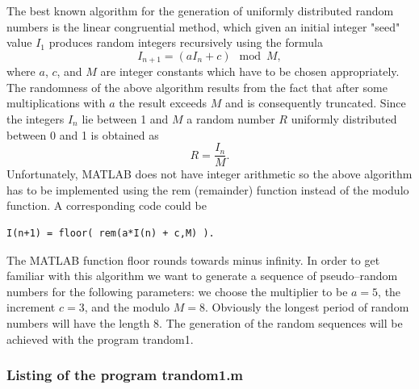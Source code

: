 The best known algorithm for the generation of uniformly 
distributed random numbers is the linear congruential method, 
which given an initial integer "seed" value $I_1$ produces random 
integers recursively using the formula
\begin{equation*}
I_{n+1} = (aI_n +c) \mod M,
\end{equation*}
where $a$, $c$, and $M$ are integer constants which have to be 
chosen appropriately. 
The randomness of the above algorithm results from the fact that 
after some multiplications with $a$ the result exceeds $M$ and is 
consequently truncated. Since the integers $I_n$ lie between 1 and 
$M$ a random number $R$ uniformly distributed 
between 0 and 1 is obtained as
\begin{equation*}
R = \frac{I_n}{M}.
\end{equation*}
Unfortunately, MATLAB does not have integer arithmetic so the above algorithm 
has to be implemented using the {\sf rem} (remainder) function 
instead of the modulo function. A corresponding code could be
\begin{verbatim}
I(n+1) = floor( rem(a*I(n) + c,M) ).
\end{verbatim}
The MATLAB function {\sf floor} rounds towards minus infinity.
In order to get familiar with this algorithm we want to generate a 
sequence of pseudo--random numbers for the following parameters:
we choose the multiplier to be $a=5$, the increment $c=3$, and the 
modulo $M=8$. Obviously the longest period of random numbers will
have the length 8. The generation of the random sequences will
be achieved with the program {\sf trandom1}.

\subsubsection{Listing of the program trandom1.m}


